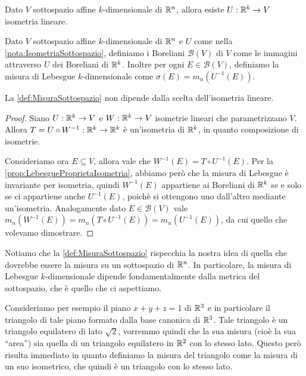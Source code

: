 \begin{remark}\label{nota:IsometriaSottospazio}
	Dato $V$ sottospazio affine $k$-dimensionale di $\mathbb R^n$, allora esiste $U:\mathbb R^k\to V$ isometria lineare.
\end{remark}

\begin{definition}\label{def:MisuraSottospazio}
	Dato $V$ sottospazio affine $k$-dimensionale di $\mathbb R^n$ e $U$ come nella \cref{nota:IsometriaSottospazio}, definiamo i Boreliani $\mathcal{B}(V)$ di $V$ come le immagini attraverso $U$ dei Boreliani di $\mathbb R^k$. Inoltre per ogni $E\in\mathcal{B}(V)$, definiamo la misura di Lebesgue $k$-dimensionale come $\sigma(E)=m_n(U^{-1}(E))$.
\end{definition}

\begin{remark}
	La \cref{def:MisuraSottospazio} non dipende dalla scelta dell'isometria lineare.
\end{remark}
\begin{proof}
	Siano $U:\mathbb R^k\to V$ e $W:\mathbb R^k\to V$ isometrie lineari che parametrizzano $V$. Allora $T=U\circ W^{-1}:\mathbb R^k\to\mathbb R^k$ è un'isometria di $\mathbb R^k$, in quanto composizione di isometrie.
	
	Consideriamo ora $E\subseteq V$, allora vale che $W^{-1}(E)=T\circ U^{-1}(E)$. Per la \cref{prop:LebesgueProprietaIsometria}, abbiamo però che la misura di Lebesgue è invariante per isometria, quindi $W^{-1}(E)$ appartiene ai Boreliani di $\mathbb R^k$ se e solo se ci appartiene anche $U^{-1}(E)$, poichè si ottengono uno dall'altro mediante un'isometria. Analogamente dato $E\in\mathcal{B}(V)$ vale $m_n(W^{-1}(E))=m_n(T\circ U^{-1}(E))=m_n(U^{-1}(E))$, da cui quello che volevamo dimostrare.
\end{proof}

Notiamo che la \cref{def:MisuraSottospazio} rispecchia la nostra idea di quella che dovrebbe essere la misura su un sottospazio di $\mathbb R^n$. In particolare, la misura di Lebesgue $k$-dimensionale dipende fondamentalmente dalla metrica del sottospazio, che è quello che ci aspettiamo.

Consideriamo per esempio il piano $x+y+z=1$ di $\mathbb R^3$ e in particolare il triangolo di tale piano formato dalla base canonica di $\mathbb R^3$. Tale triangolo è un triangolo equilatero di lato $\sqrt{2}$, vorremmo quindi che la sua misura (cioè la sua ``area'') sia quella di un triangolo equilatero in $\mathbb R^2$ con lo stesso lato. Questo però risulta immediato in quanto definiamo la misura del triangolo come la misura di un suo isometrico, che quindi è un triangolo con lo stesso lato.


